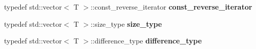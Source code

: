 \begin{DoxyCompactItemize}
\item 
typedef std\+::vector$<$ T $>$\+::const\+\_\+reverse\+\_\+iterator {\bfseries const\+\_\+reverse\+\_\+iterator}\hypertarget{classhistory_af69dda1a073ab63c39d22859edd2e7f2}{}\label{classhistory_af69dda1a073ab63c39d22859edd2e7f2}

\item 
typedef std\+::vector$<$ T $>$\+::size\+\_\+type {\bfseries size\+\_\+type}\hypertarget{classhistory_a3eb5fea10c0c7581d6ba411f4089836e}{}\label{classhistory_a3eb5fea10c0c7581d6ba411f4089836e}

\item 
typedef std\+::vector$<$ T $>$\+::difference\+\_\+type {\bfseries difference\+\_\+type}\hypertarget{classhistory_ac88016084b4f33426c10131200893380}{}\label{classhistory_ac88016084b4f33426c10131200893380}

\end{DoxyCompactItemize}
